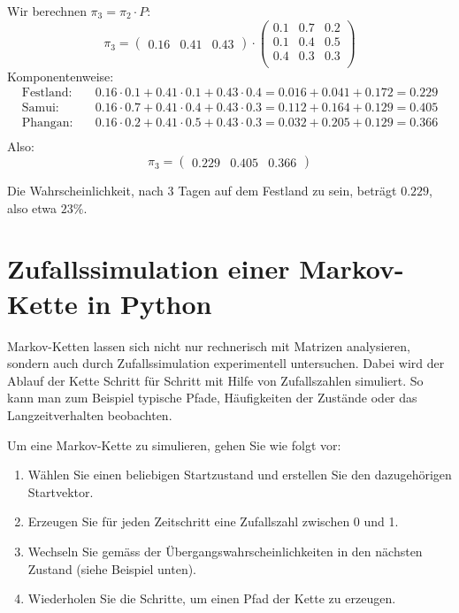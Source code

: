 \begin{mychallenge}
\begin{myanswer}
        Wir berechnen $\pi_3 = \pi_2 \cdot P$:
        \[
            \pi_3 = \begin{pmatrix} 0.16 & 0.41 & 0.43 \end{pmatrix}
            \cdot
            \begin{pmatrix}
                0.1 & 0.7 & 0.2 \\
                0.1 & 0.4 & 0.5 \\
                0.4 & 0.3 & 0.3 \\
            \end{pmatrix}
        \]
        Komponentenweise:
        \begin{align*}
            \text{Festland:} & \quad 0.16 \cdot 0.1 + 0.41 \cdot 0.1 + 0.43 \cdot 0.4 = 0.016 + 0.041 + 0.172 = 0.229 \\
            \text{Samui:}    & \quad 0.16 \cdot 0.7 + 0.41 \cdot 0.4 + 0.43 \cdot 0.3 = 0.112 + 0.164 + 0.129 = 0.405 \\
            \text{Phangan:}  & \quad 0.16 \cdot 0.2 + 0.41 \cdot 0.5 + 0.43 \cdot 0.3 = 0.032 + 0.205 + 0.129 = 0.366 \\
        \end{align*}
        Also:
        \[
            \pi_3 = \begin{pmatrix} 0.229 & 0.405 & 0.366 \end{pmatrix}
        \]

        Die Wahrscheinlichkeit, nach 3 Tagen auf dem Festland zu sein, beträgt $0.229$, also etwa $23\%$.
    \end{myanswer}
\end{mychallenge}


\section{Zufallssimulation einer Markov-Kette in Python}

Markov-Ketten lassen sich nicht nur rechnerisch mit Matrizen analysieren, sondern auch durch Zufallssimulation experimentell untersuchen. Dabei wird der Ablauf der Kette Schritt für Schritt mit Hilfe von Zufallszahlen simuliert. So kann man zum Beispiel typische Pfade, Häufigkeiten der Zustände oder das Langzeitverhalten beobachten.

Um eine Markov-Kette zu simulieren, gehen Sie wie folgt vor:
\begin{enumerate}
    \item Wählen Sie einen beliebigen Startzustand und erstellen Sie den dazugehörigen Startvektor.
    \item Erzeugen Sie für jeden Zeitschritt eine Zufallszahl zwischen 0 und 1.
    \item Wechseln Sie gemäss der Übergangswahrscheinlichkeiten in den nächsten Zustand (siehe Beispiel unten).
    \item Wiederholen Sie die Schritte, um einen Pfad der Kette zu erzeugen.
\end{enumerate}

